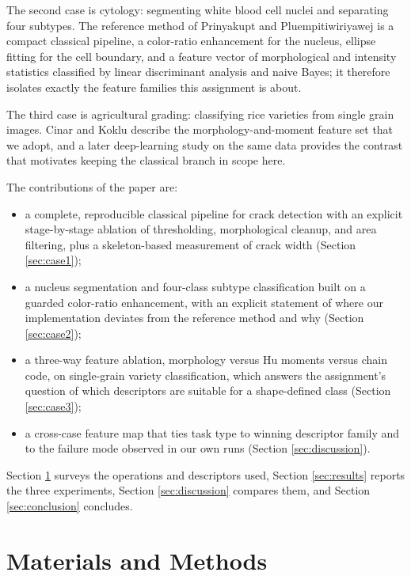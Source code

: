 \documentclass{ieeeaccess}
\begin{document}
The second case is cytology: segmenting white blood cell nuclei and separating
four subtypes. The reference method of Prinyakupt and Pluempitiwiriyawej
\cite{prinyakupt2015} is a compact classical pipeline, a color-ratio enhancement
for the nucleus, ellipse fitting for the cell boundary, and a feature vector of
morphological and intensity statistics classified by linear discriminant
analysis and naive Bayes; it therefore isolates exactly the feature families
this assignment is about.

The third case is agricultural grading: classifying rice varieties from single
grain images. Cinar and Koklu \cite{cinar2019} describe the morphology-and-moment
feature set that we adopt, and a later deep-learning study on the same data
\cite{koklu2021} provides the contrast that motivates keeping the classical
branch in scope here.

The contributions of the paper are:
\begin{itemize}
\item a complete, reproducible classical pipeline for crack detection with an
explicit stage-by-stage ablation of thresholding, morphological cleanup, and area
filtering, plus a skeleton-based measurement of crack width (Section
\ref{sec:case1});
\item a nucleus segmentation and four-class subtype classification built on a
guarded color-ratio enhancement, with an explicit statement of where our
implementation deviates from the reference method and why (Section
\ref{sec:case2});
\item a three-way feature ablation, morphology versus Hu moments versus chain
code, on single-grain variety classification, which answers the assignment's
question of which descriptors are suitable for a shape-defined class (Section
\ref{sec:case3});
\item a cross-case feature map that ties task type to winning descriptor family
and to the failure mode observed in our own runs (Section \ref{sec:discussion}).
\end{itemize}

Section \ref{sec:method} surveys the operations and descriptors used, Section
\ref{sec:results} reports the three experiments, Section \ref{sec:discussion}
compares them, and Section \ref{sec:conclusion} concludes.

\section{Materials and Methods}
\label{sec:method}
\end{document}
